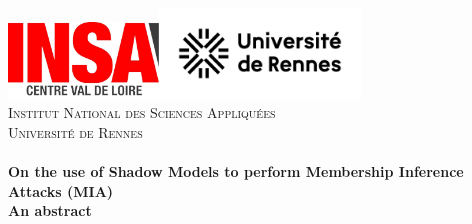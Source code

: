 \begin{titlepage}
    \begin{center}
        \includegraphics[width=0.30\textwidth]{figures/logos/Logo_INSA_CVL}\hspace{0.5cm}\includegraphics[width=0.40\textwidth]{figures/logos/Logo_UniversitéDeRennes}\\[0.9cm]

        \textsc{\LARGE Institut National des Sciences Appliquées}\\[0.35cm]
        \textsc{\LARGE Université de Rennes}\\[1.5cm]

        \HRule \\[0.4cm]

            {\huge \bfseries On the use of Shadow Models to perform Membership Inference Attacks (MIA)\\[0.15cm]
            \Large An abstract \\[0.4cm] }

        \HRule \\[1cm]


\end{center}
\end{titlepage}
